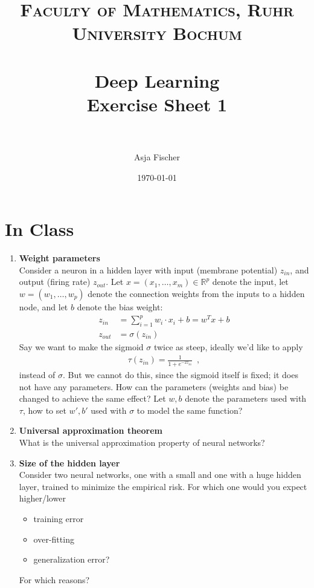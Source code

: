 \documentclass[paper=a4, fontsize=11pt]{scrartcl} %
\title{	
\normalfont \normalsize 
\textsc{Faculty of Mathematics, Ruhr University Bochum} \\ [25pt] %
\horrule{0.5pt} \\[0.4cm] %
\huge Deep Learning\\{\Large Exercise Sheet 1}\\ %
\horrule{2pt} \\[0.5cm] %
}
\author{Asja Fischer} %
\date{\normalsize\today} %
\numberwithin{equation}{section} %
\numberwithin{figure}{section} %
\numberwithin{table}{section} %
\begin{document}
\maketitle %
\section{In Class}
\begin{enumerate} 

\item \textbf{Weight parameters} \\
Consider a neuron in a hidden layer with input (membrane potential) $z_{in}$, and output (firing rate) $z_{out}$. 
Let $x = (x_1, \dots, x_m) \in \mathbb{R}^p$ denote the input, let $w = (w_1, \dots, w_p)$ denote the connection weights
from the inputs to a hidden node, and let $b$ denote the bias weight:
\begin{align*}
z_{in} &= \sum_{i=1}^p w_i \cdot x_i + b = w^T x + b \\
  z_{out} &= \sigma(z_{in}) 
\end{align*}
Say we want to make the sigmoid $\sigma$ twice as steep, ideally we'd like to apply
 \begin{align*}
 \tau(z_{in}) =  \frac{1}{1 + e^{-2 z_{in}}} \enspace, 
  \end{align*}
  instead of $\sigma$. But we cannot do this, since the sigmoid itself is fixed; it does not have any parameters.
  How can the parameters (weights and bias) be changed to achieve the same effect? Let $w, b$ denote the parameters used with $\tau$, how to set $w', b'$ used with $\sigma$ to model the same function?
  
\item\textbf{Universal approximation theorem}\\
What is the universal approximation property of neural networks?
  
\item\textbf{Size of the hidden layer}\\
Consider two neural networks, one with a small and one with a huge hidden layer, trained to minimize the empirical risk.
 For which one would you expect higher/lower
  \begin{itemize}
  \item training error
  \item over-fitting
   \item generalization error?
   \end{itemize}
For which reasons?


\end{enumerate}
\end{document}
